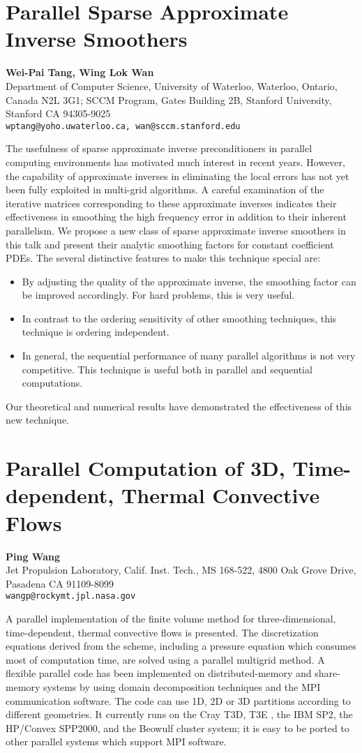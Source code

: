 \documentclass[11pt]{article}
\newcommand{\nextab}[4]{
	\section{#2}
	{\bf #1} \\ \nopagebreak
	{#3} \\ \nopagebreak
	{\tt #4} \nopagebreak
	}
\begin{document}

\nextab{Wei-Pai Tang, Wing Lok Wan}
	{Parallel Sparse Approximate Inverse Smoothers}
	{Department of Computer Science, University of Waterloo,
		Waterloo, Ontario, Canada N2L 3G1;
		SCCM Program, Gates Building 2B,
		Stanford University, Stanford CA 94305-9025}
	{wptang@yoho.uwaterloo.ca, wan@sccm.stanford.edu}

The usefulness of sparse approximate inverse preconditioners in parallel
computing environments has motivated much interest in recent years. However,
the capability of approximate inverses in eliminating the local
errors has not yet been fully exploited in multi-grid algorithms.
A careful examination of the iterative matrices corresponding to these
approximate inverses indicates their effectiveness in smoothing the
high frequency error in addition to their inherent parallelism.
We propose a new class of sparse approximate inverse smoothers in this talk
and present their analytic smoothing factors for constant coefficient PDEs.
The several distinctive features to make this technique special are:
\begin{itemize}
\item By adjusting the quality of the approximate inverse, the smoothing
     factor can be improved accordingly. For hard problems, this is very
     useful.
\item In contrast to the ordering sensitivity of other smoothing techniques,
     this technique is ordering independent.
\item In general, the sequential performance of many parallel algorithms is
     not very competitive. This technique is useful both in parallel and
     sequential  computations.
\end{itemize}
Our theoretical and numerical results have demonstrated the effectiveness of
this new technique.


\nextab{Ping Wang}
	{Parallel Computation of 3D, Time-dependent, Thermal Convective Flows}
	{Jet Propulsion Laboratory, Calif. Inst. Tech.,
		MS 168-522, 4800 Oak Grove Drive, Pasadena CA 91109-8099}
	{wangp@rockymt.jpl.nasa.gov}

A parallel implementation of the finite volume method
for three-dimensional, time-dependent,
thermal convective flows is presented.
The discretization equations derived from the scheme, including
a pressure equation which consumes
most of computation time,
are solved using a parallel multigrid method. A flexible parallel
code has been implemented on distributed-memory and share-memory systems
by using domain decomposition
techniques and the MPI
communication software. The code can use 1D, 2D
or 3D partitions according to different geometries. It currently runs
on the Cray T3D, T3E , the IBM SP2, the HP/Convex SPP2000,
and the Beowulf cluster system; it is easy to be
ported to other parallel systems which support MPI software.
\end{document}
